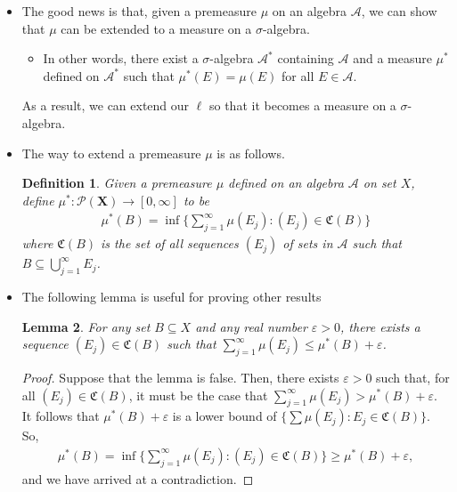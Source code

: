\documentclass[10pt]{article}
\newtheorem{lemma}{Lemma}
\newtheorem{definition}[lemma]{Definition}
\newcommand{\ve}[1]{\mathbf{#1}}
\newcommand{\mcal}[1]{\mathcal{#1}}
\begin{document}
\begin{itemize}
  \item The good news is that, given a premeasure $\mu$ on an algebra $\mcal{A}$, we can show that $\mu$ can be extended to a measure on a $\sigma$-algebra.
  \begin{itemize}
    \item In other words, there exist a $\sigma$-algebra $\mcal{A}^*$ containing $\mcal{A}$ and a measure $\mu^*$ defined on $\mcal{A}^*$ such that $\mu^*(E) = \mu(E)$ for all $E \in \mcal{A}$. 
  \end{itemize}
  As a result, we can extend our $\ell$ so that it becomes a measure on a $\sigma$-algebra.

  \item The way to extend a premeasure $\mu$ is as follows.
  \begin{definition}
    Given a premeasure $\mu$ defined on an algebra $\mcal{A}$ on set $X$, define $\mu^*: \mcal{P}(\ve{X}) \rightarrow [0,\infty]$ to be
    \begin{align*}
      \mu^*(B) = \inf \bigg\{ \sum_{j=1}^\infty \mu(E_j) : (E_j) \in \mathfrak{C}(B) \bigg\}
    \end{align*}
    where $\mathfrak{C}(B)$ is the set of all sequences $(E_j)$ of sets in $\mcal{A}$ such that $B \subseteq \bigcup_{j=1}^\infty E_j$.
  \end{definition}
  
  \item The following lemma is useful for proving other results
  
  \begin{lemma} \label{lemma:epsilon-cover}
    For any set $B \subseteq X$ and any real number $\varepsilon > 0$, there exists a sequence $(E_j) \in \mathfrak{C}(B)$ such that $\sum_{j=1}^\infty \mu(E_j) \leq \mu^*(B) + \varepsilon$.
  \end{lemma}

  \begin{proof}
    Suppose that the lemma is false. Then, there exists $\varepsilon > 0$ such that, for all $(E_j) \in \mathfrak{C}(B)$, it must be the case that $\sum_{j=1}^\infty \mu(E_j) > \mu^*(B) + \varepsilon$. It follows that $\mu^*(B) + \varepsilon$ is a lower bound of $\{ \sum \mu(E_j) : E_j \in \mathfrak{C}(B) \}$. So,
    \begin{align*}
      \mu^*(B) = \inf \bigg\{ \sum_{j=1}^\infty \mu(E_j) : (E_j) \in \mathfrak{C}(B) \bigg\}
      \geq \mu^*(B) + \varepsilon,
    \end{align*}
    and we have arrived at a contradiction.
  \end{proof}


\end{itemize}
\end{document}
